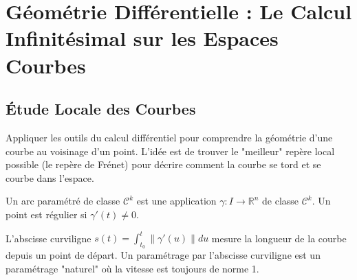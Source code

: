
\chapter{Géométrie Différentielle : Le Calcul Infinitésimal sur les Espaces Courbes}

\section{Étude Locale des Courbes}

\begin{objectif}
    Appliquer les outils du calcul différentiel pour comprendre la géométrie d'une courbe au voisinage d'un point. L'idée est de trouver le "meilleur" repère local possible (le repère de Frénet) pour décrire comment la courbe se tord et se courbe dans l'espace.
\end{objectif}

\begin{definition}
    Un arc paramétré de classe $\mathcal{C}^k$ est une application $\gamma: I \to \mathbb{R}^n$ de classe $\mathcal{C}^k$. Un point est régulier si $\gamma'(t) \neq 0$.
\end{definition}

\begin{definition}
    L'abscisse curviligne $s(t) = \int_{t_0}^t \|\gamma'(u)\| du$ mesure la longueur de la courbe depuis un point de départ. Un paramétrage par l'abscisse curviligne est un paramétrage "naturel" où la vitesse est toujours de norme 1.
\end{definition}

